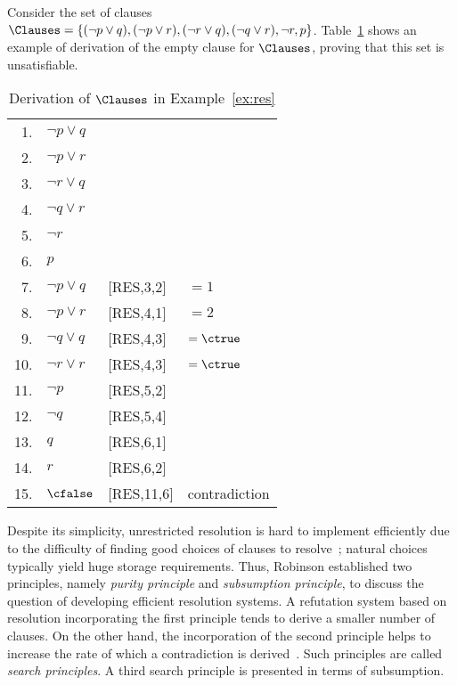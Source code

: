 \begin{example}%
\label{ex:res}
    Consider the set of clauses $\Clauses = \{(\neg p \lor q), (\neg p \lor r),
    (\neg r \lor q), (\neg q \lor r), \neg r, p\}$. Table~\ref{tab:res} shows an
    example of derivation of the empty clause for $\Clauses$, proving that this
    set is unsatisfiable.

    \begin{table}%
    \caption{Derivation of $\Clauses$ in Example~\ref{ex:res}}
        \centering
        \begin{tabular}{rlll}
            1. & $\neg p \lor q$ & & \\
            2. & $\neg p \lor r$ & & \\
            3. & $\neg r \lor q$ & & \\
            4. & $\neg q \lor r$ & & \\
            5. & $\neg r$ & & \\
            6. & $p$ & & \\
            7. & $\neg p \lor q$ & [RES,3,2] & $= 1$\\
            8. & $\neg p \lor r$ & [RES,4,1] & $= 2$\\
            9. & $\neg q \lor q$ & [RES,4,3] & $= \ctrue$\\
            10.&  $\neg r \lor r$ & [RES,4,3] & $= \ctrue$\\
            11.&  $\neg p$ & [RES,5,2] & \\
            12.&  $\neg q$ & [RES,5,4] & \\
            13.&  $q$ & [RES,6,1] & \\
            14.&  $r$ & [RES,6,2] & \\
            15.&  $\cfalse$ & [RES,11,6] & contradiction\\
        \end{tabular}%
    \label{tab:res}
    \end{table}
\end{example}

Despite its simplicity, unrestricted resolution is hard to implement efficiently
due to the difficulty of finding good choices of clauses to
resolve~\cite{satchapter}; natural choices typically yield huge storage
requirements. Thus, Robinson established two principles, namely
\emph{purity principle} and \emph{subsumption principle}, to discuss the question of
developing efficient resolution systems. A refutation system based on resolution
incorporating the first principle tends to derive a smaller number of clauses.
On the other hand, the incorporation of the second principle helps to increase the
rate of which a contradiction is derived~\cite{Robinson65}. Such principles are
called \emph{search principles}. A third search principle is presented in terms
of subsumption.

